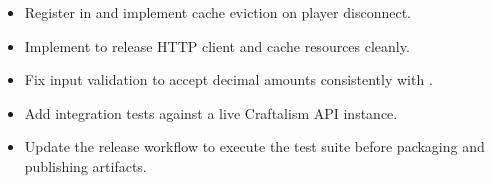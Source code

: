 \begin{itemize}
  \item Register  in  and implement cache eviction on player disconnect.
  \item Implement  to release HTTP client and cache resources cleanly.
  \item Fix  input validation to accept decimal amounts consistently with .
  \item Add integration tests against a live Craftalism API instance.
  \item Update the release workflow to execute the test suite before packaging and publishing artifacts.
\end{itemize}
